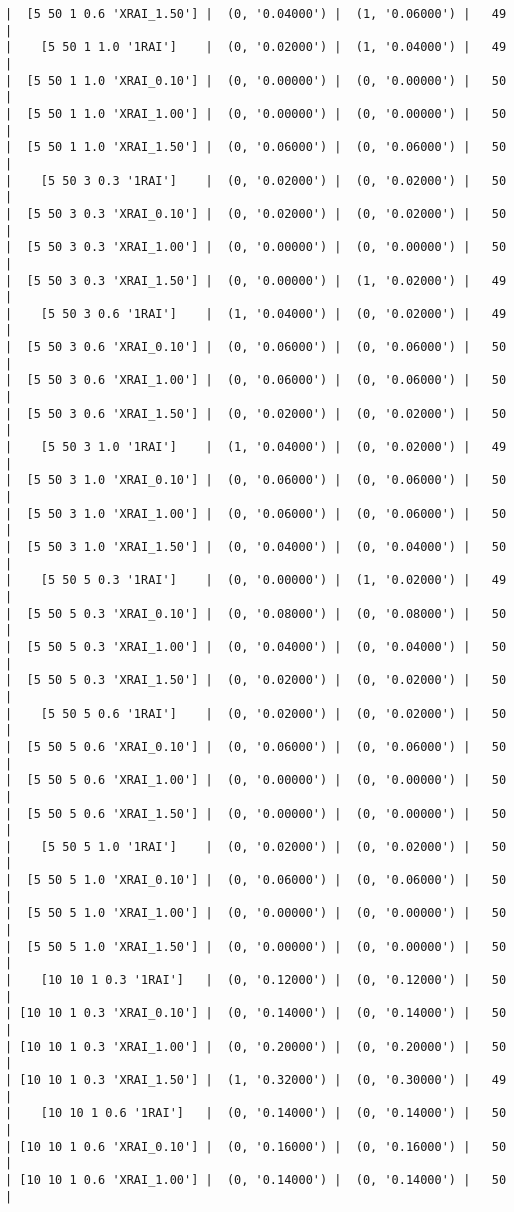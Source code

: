 \documentclass{article}
\begin{document}
\begin{verbatim}
|  [5 50 1 0.6 'XRAI_1.50'] |  (0, '0.04000') |  (1, '0.06000') |   49  |
|    [5 50 1 1.0 '1RAI']    |  (0, '0.02000') |  (1, '0.04000') |   49  |
|  [5 50 1 1.0 'XRAI_0.10'] |  (0, '0.00000') |  (0, '0.00000') |   50  |
|  [5 50 1 1.0 'XRAI_1.00'] |  (0, '0.00000') |  (0, '0.00000') |   50  |
|  [5 50 1 1.0 'XRAI_1.50'] |  (0, '0.06000') |  (0, '0.06000') |   50  |
|    [5 50 3 0.3 '1RAI']    |  (0, '0.02000') |  (0, '0.02000') |   50  |
|  [5 50 3 0.3 'XRAI_0.10'] |  (0, '0.02000') |  (0, '0.02000') |   50  |
|  [5 50 3 0.3 'XRAI_1.00'] |  (0, '0.00000') |  (0, '0.00000') |   50  |
|  [5 50 3 0.3 'XRAI_1.50'] |  (0, '0.00000') |  (1, '0.02000') |   49  |
|    [5 50 3 0.6 '1RAI']    |  (1, '0.04000') |  (0, '0.02000') |   49  |
|  [5 50 3 0.6 'XRAI_0.10'] |  (0, '0.06000') |  (0, '0.06000') |   50  |
|  [5 50 3 0.6 'XRAI_1.00'] |  (0, '0.06000') |  (0, '0.06000') |   50  |
|  [5 50 3 0.6 'XRAI_1.50'] |  (0, '0.02000') |  (0, '0.02000') |   50  |
|    [5 50 3 1.0 '1RAI']    |  (1, '0.04000') |  (0, '0.02000') |   49  |
|  [5 50 3 1.0 'XRAI_0.10'] |  (0, '0.06000') |  (0, '0.06000') |   50  |
|  [5 50 3 1.0 'XRAI_1.00'] |  (0, '0.06000') |  (0, '0.06000') |   50  |
|  [5 50 3 1.0 'XRAI_1.50'] |  (0, '0.04000') |  (0, '0.04000') |   50  |
|    [5 50 5 0.3 '1RAI']    |  (0, '0.00000') |  (1, '0.02000') |   49  |
|  [5 50 5 0.3 'XRAI_0.10'] |  (0, '0.08000') |  (0, '0.08000') |   50  |
|  [5 50 5 0.3 'XRAI_1.00'] |  (0, '0.04000') |  (0, '0.04000') |   50  |
|  [5 50 5 0.3 'XRAI_1.50'] |  (0, '0.02000') |  (0, '0.02000') |   50  |
|    [5 50 5 0.6 '1RAI']    |  (0, '0.02000') |  (0, '0.02000') |   50  |
|  [5 50 5 0.6 'XRAI_0.10'] |  (0, '0.06000') |  (0, '0.06000') |   50  |
|  [5 50 5 0.6 'XRAI_1.00'] |  (0, '0.00000') |  (0, '0.00000') |   50  |
|  [5 50 5 0.6 'XRAI_1.50'] |  (0, '0.00000') |  (0, '0.00000') |   50  |
|    [5 50 5 1.0 '1RAI']    |  (0, '0.02000') |  (0, '0.02000') |   50  |
|  [5 50 5 1.0 'XRAI_0.10'] |  (0, '0.06000') |  (0, '0.06000') |   50  |
|  [5 50 5 1.0 'XRAI_1.00'] |  (0, '0.00000') |  (0, '0.00000') |   50  |
|  [5 50 5 1.0 'XRAI_1.50'] |  (0, '0.00000') |  (0, '0.00000') |   50  |
|    [10 10 1 0.3 '1RAI']   |  (0, '0.12000') |  (0, '0.12000') |   50  |
| [10 10 1 0.3 'XRAI_0.10'] |  (0, '0.14000') |  (0, '0.14000') |   50  |
| [10 10 1 0.3 'XRAI_1.00'] |  (0, '0.20000') |  (0, '0.20000') |   50  |
| [10 10 1 0.3 'XRAI_1.50'] |  (1, '0.32000') |  (0, '0.30000') |   49  |
|    [10 10 1 0.6 '1RAI']   |  (0, '0.14000') |  (0, '0.14000') |   50  |
| [10 10 1 0.6 'XRAI_0.10'] |  (0, '0.16000') |  (0, '0.16000') |   50  |
| [10 10 1 0.6 'XRAI_1.00'] |  (0, '0.14000') |  (0, '0.14000') |   50  |

\end{verbatim}
\end{document}
